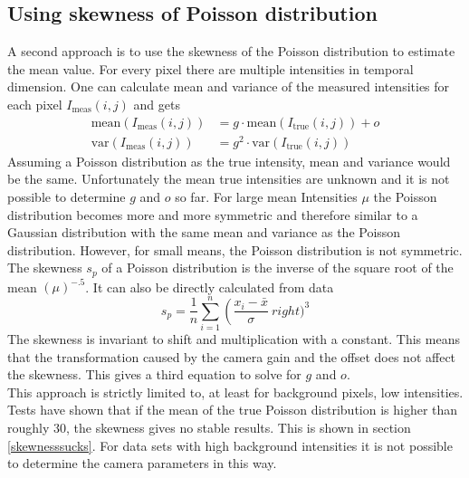 \subsection{Using skewness of Poisson distribution}
A second approach is to use the skewness of the Poisson distribution to estimate the mean value.\newline
For every pixel there are multiple intensities in temporal dimension. One can
calculate mean and variance of the measured intensities for each pixel $I_\text{meas}(i,j)$ and
gets
\begin{align}
	\text{mean}(I_\text{meas}(i,j))& = g\cdot \text{mean}(I_\text{true}(i,j)) + o \label{meanvarPoiss1}\\
	\text{var}(I_\text{meas}(i,j))& = g^2\cdot\text{var}(I_\text{true}(i,j)) \label{meanvarPoiss2}
\end{align}
Assuming a Poisson distribution as the true intensity, mean and variance would
be the same. Unfortunately the mean true intensities are unknown and it is
not possible to determine $g$ and $o$ so far. For large mean Intensities $\mu$
the Poisson distribution becomes more and more symmetric and therefore similar to a Gaussian distribution
with the same mean and variance as the Poisson distribution. However, for small means, the Poisson distribution is not
symmetric. The skewness $s_p$ of a Poisson distribution is the inverse of the
square root of the mean $(\mu)^{-.5}$. It can also be directly
calculated from data
\begin{equation}
	s_p = \frac{1}{n}\sum_{i = 1}^n \left(\frac{x_i - \bar x}{\sigma}\ right)^3
\end{equation}
The skewness is invariant to shift and multiplication with a constant. This
means that the transformation caused by the camera gain and the offset
does not affect the skewness. This gives a third equation to solve for $g$ and
$o$.\\
This approach is strictly limited to, at least for background pixels, low intensities. Tests have shown that if the mean of the true Poisson distribution is higher than roughly 30, the skewness gives no stable results. This is shown in section \ref{skewnesssucks}. For data sets with high background intensities it is not possible to determine the camera parameters in this way.


